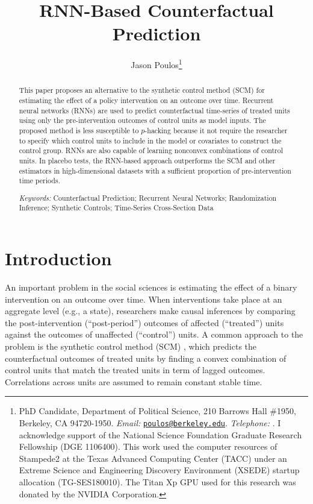 \documentclass[hidelinks,12pt]{article}
\title{RNN-Based Counterfactual Prediction}
\author[ ]{Jason Poulos\thanks{PhD Candidate, Department of Political Science, 210 Barrows Hall \#1950, Berkeley, CA 94720-1950. \emph{Email:} \href{mailto:poulos@berkeley.edu}{\nolinkurl{poulos@berkeley.edu}}. \emph{Telephone:} \Plus 1\Minus 510\Minus 642\Minus 6323. I acknowledge support of the National Science Foundation Graduate Research Fellowship (DGE 1106400). This work used the computer resources of Stampede2 at the Texas Advanced Computing Center (TACC) under an Extreme Science and Engineering Discovery Environment (XSEDE) startup allocation (TG-SES180010). The Titan Xp GPU used for this research was donated by the NVIDIA Corporation.}}
\affil[ ]{University of California, Berkeley}
\date{}
\begin{document}
 
 
\begin{singlespacing}
\maketitle  
\end{singlespacing}
\thispagestyle{empty}

\begin{abstract}  %
\noindent 
This paper proposes an alternative to the synthetic control method (SCM) for estimating the effect of a policy intervention on an outcome over time. Recurrent neural networks (RNNs) are used to predict counterfactual time-series of treated units using only the pre-intervention outcomes of control units as model inputs. The proposed method is less susceptible to $p$-hacking because it not require the researcher to specify which control units to include in the model or covariates to construct the control group. RNNs are also capable of learning nonconvex combinations of control units. In placebo tests, the RNN-based approach outperforms the SCM and other estimators in high-dimensional datasets with a sufficient proportion of pre-intervention time periods. 
\\
\begin{singlespace}
	\emph{Keywords:} Counterfactual Prediction; Recurrent Neural Networks; Randomization Inference; Synthetic Controls; Time-Series Cross-Section Data
\end{singlespace}
\end{abstract}

\pagebreak
{}%

\section{Introduction} 

An important problem in the social sciences is estimating the effect of a binary intervention on an outcome over time. When interventions take place at an aggregate level (e.g., a state), researchers make causal inferences by comparing the post-intervention (``post-period'') outcomes of affected (``treated'') units against the outcomes of unaffected  (``control'') units. A common approach to the problem is the synthetic control method (SCM) \citep{abadie2010synthetic}, which predicts the counterfactual outcomes of treated units by finding a convex combination of control units that match the treated units in term of lagged outcomes. Correlations across units are assumed to remain constant stable time. 
\end{document}
